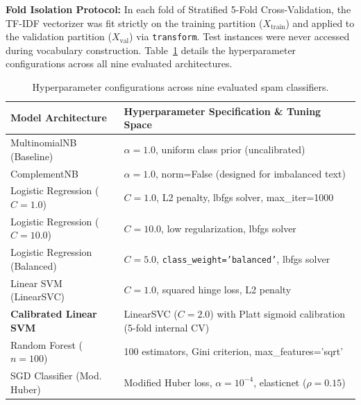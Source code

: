 \documentclass[10pt,onecolumn,letterpaper]{article}
\begin{document}
\textbf{Fold Isolation Protocol:} In each fold of Stratified 5-Fold Cross-Validation, the TF-IDF vectorizer was fit strictly on the training partition ($X_{\text{train}}$) and applied to the validation partition ($X_{\text{val}}$) via \texttt{transform}. Test instances were never accessed during vocabulary construction. Table~\ref{tab:model_specs} details the hyperparameter configurations across all nine evaluated architectures.

\begin{table}[htbp]
\centering
\footnotesize
\setlength{\tabcolsep}{4.0pt}
\renewcommand{\arraystretch}{1.08}
\begin{tabularx}{\textwidth}{l X}
\toprule
\textbf{Model Architecture} & \textbf{Hyperparameter Specification \& Tuning Space} \\
\midrule
MultinomialNB (Baseline) & $\alpha=1.0$, uniform class prior (uncalibrated) \\
ComplementNB & $\alpha=1.0$, norm=False (designed for imbalanced text) \\
Logistic Regression ($C=1.0$) & $C=1.0$, L2 penalty, lbfgs solver, max\_iter=1000 \\
Logistic Regression ($C=10.0$) & $C=10.0$, low regularization, lbfgs solver \\
Logistic Regression (Balanced) & $C=5.0$, \texttt{class\_weight='balanced'}, lbfgs solver \\
Linear SVM (LinearSVC) & $C=1.0$, squared hinge loss, L2 penalty \\
\textbf{Calibrated Linear SVM} & LinearSVC ($C=2.0$) with Platt sigmoid calibration (5-fold internal CV) \\
Random Forest ($n=100$) & 100 estimators, Gini criterion, max\_features='sqrt' \\
SGD Classifier (Mod. Huber) & Modified Huber loss, $\alpha=10^{-4}$, elasticnet ($\rho=0.15$) \\
\bottomrule
\end{tabularx}
\caption{Hyperparameter configurations across nine evaluated spam classifiers.}
\label{tab:model_specs}
\end{table}
\end{document}
